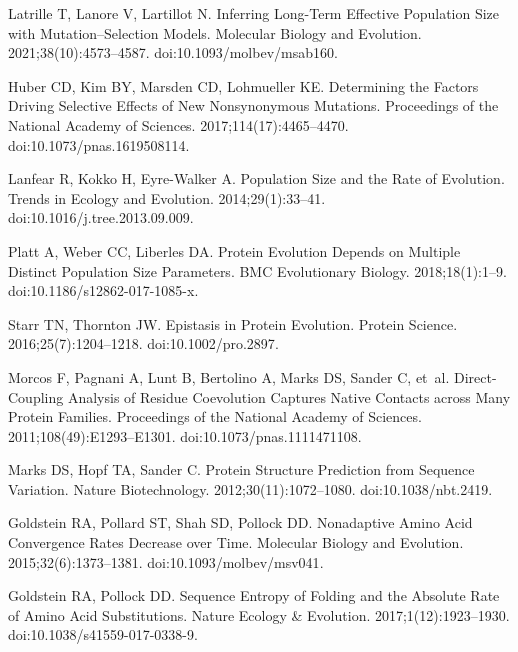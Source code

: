 \documentclass[10pt,letterpaper]{article}
\begin{document}
\begin{thebibliography}{10}
Latrille T, Lanore V, Lartillot N.
\newblock Inferring Long-Term Effective Population Size with
Mutation--Selection Models.
\newblock Molecular Biology and Evolution. 2021;38(10):4573--4587.
\newblock doi:{10.1093/molbev/msab160}.

Huber CD, Kim BY, Marsden CD, Lohmueller KE.
\newblock Determining the Factors Driving Selective Effects of New
Nonsynonymous Mutations.
\newblock Proceedings of the National Academy of Sciences.
2017;114(17):4465--4470.
\newblock doi:{10.1073/pnas.1619508114}.

Lanfear R, Kokko H, {Eyre-Walker} A.
\newblock Population Size and the Rate of Evolution.
\newblock Trends in Ecology and Evolution. 2014;29(1):33--41.
\newblock doi:{10.1016/j.tree.2013.09.009}.

Platt A, Weber CC, Liberles DA.
\newblock Protein Evolution Depends on Multiple Distinct Population Size
Parameters.
\newblock BMC Evolutionary Biology. 2018;18(1):1--9.
\newblock doi:{10.1186/s12862-017-1085-x}.

Starr TN, Thornton JW.
\newblock Epistasis in Protein Evolution.
\newblock Protein Science. 2016;25(7):1204--1218.
\newblock doi:{10.1002/pro.2897}.

Morcos F, Pagnani A, Lunt B, Bertolino A, Marks DS, Sander C, et~al.
\newblock Direct-Coupling Analysis of Residue Coevolution Captures Native
Contacts across Many Protein Families.
\newblock Proceedings of the National Academy of Sciences.
2011;108(49):E1293--E1301.
\newblock doi:{10.1073/pnas.1111471108}.

Marks DS, Hopf TA, Sander C.
\newblock Protein Structure Prediction from Sequence Variation.
\newblock Nature Biotechnology. 2012;30(11):1072--1080.
\newblock doi:{10.1038/nbt.2419}.

Goldstein RA, Pollard ST, Shah SD, Pollock DD.
\newblock Nonadaptive {{Amino Acid Convergence Rates Decrease}} over {{Time}}.
\newblock Molecular Biology and Evolution. 2015;32(6):1373--1381.
\newblock doi:{10.1093/molbev/msv041}.

Goldstein RA, Pollock DD.
\newblock Sequence Entropy of Folding and the Absolute Rate of Amino Acid
Substitutions.
\newblock Nature Ecology \& Evolution. 2017;1(12):1923--1930.
\newblock doi:{10.1038/s41559-017-0338-9}.


\end{thebibliography}
\end{document}
